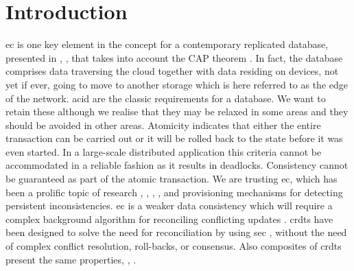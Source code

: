 \section{Introduction}
\gls{ec} is one key element in the concept for a contemporary replicated database, presented in \cite{Shapiro2009a}, \cite{Saito2005a}, that takes into account the CAP theorem \cite{Gilbert2002a} . In fact, the database comprises data traversing the cloud together with data residing on devices, not yet if ever, going to move to another storage which is here referred to as the edge of the network. \gls{acid} are the classic requirements for a database. We want to retain these although we realise that they may be relaxed in some areas and they should be avoided in other areas. Atomicity indicates that either the entire transaction can be carried out or it will be rolled back to the state before it was even started. In a large-scale distributed application this criteria cannot be accommodated in a reliable fashion as it results in deadlocks. Consistency cannot be guaranteed as part of the atomic transaction. We are trusting \gls{ec}, which has been a prolific topic of research \cite{shapiro11comprehensive}, \cite{Vogels2009a}, \cite{Saito2005a}, \cite{Baquero1997a}, and provisioning mechanisms for detecting persistent inconsistencies. \gls{ec} is a weaker data consistency which will require a complex background algorithm for reconciling conflicting updates \cite{Terry1995a}. \glspl{crdt} have been designed to solve the need for reconciliation by using \gls{sec} \cite{shapiro11conflictfree}, without the need of complex conflict resolution, roll-backs, or consensus. Also composites of \glspl{crdt} present the same properties, \cite{Deftu2013a}, \cite{shapiro11comprehensive}.